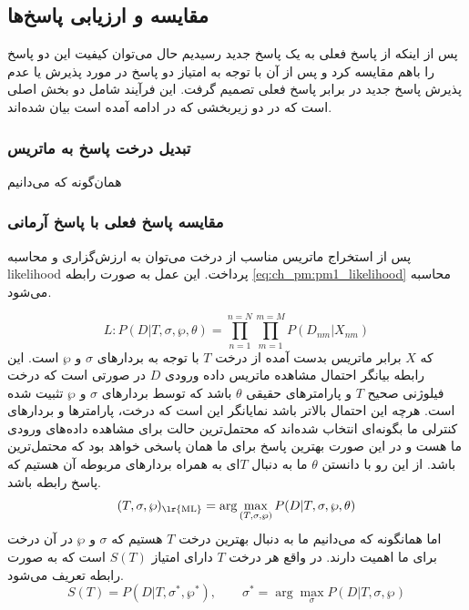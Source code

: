 \subsection{مقایسه و ارزیابی پاسخ‌ها}
پس از اینکه از پاسخ فعلی به یک پاسخ جدید رسیدیم حال می‌توان کیفیت این دو پاسخ را باهم مقایسه کرد و پس از آن با توجه به امتیاز دو پاسخ در مورد پذیرش یا عدم پذیرش پاسخ جدید در برابر پاسخ فعلی تصمیم گرفت. این فرآیند شامل دو بخش اصلی است که در دو زیربخشی که در ادامه آمده است بیان شده‌اند.

\subsubsection{تبدیل درخت پاسخ به ماتریس}
همان‌گونه که می‌دانیم 

\subsubsection{مقایسه پاسخ فعلی با پاسخ آرمانی}
پس از استخراج ماتریس مناسب از درخت می‌توان به ارزش‌گزاری و محاسبه \gls{likelihood} پرداخت. این عمل به صورت رابطه \ref{eq:ch_pm:pm1_likelihood} محاسبه می‌شود. 

\begin{equation}
	L: P(D|T,\sigma, \wp, \theta) = \prod_{n=1}^{n=N}\prod_{m=1}^{m=M}P(D_{nm}|X_{nm})
	\label{eq:ch_pm:pm1_likelihood}
\end{equation}
که $X$ برابر ماتریس بدست آمده از درخت $T$ با توجه به بردارهای $\sigma$ و $\wp$ است. این رابطه بیانگر احتمال مشاهده ماتریس داده ورودی $D$ در صورتی است که درخت فیلوژنی صحیح $T$ و پارامترهای حقیقی $\theta$ باشد که توسط بردارهای $\sigma$ و $\wp$ تثبیت شده است. هرچه این احتمال بالاتر باشد نمایانگر این است که درخت، پارامترها و بردارهای کنترلی ما بگونه‌ای انتخاب شده‌اند که محتمل‌ترین حالت برای مشاهده داده‌های ورودی ما هست و در این صورت بهترین پاسخ برای ما همان پاسخی خواهد بود که محتمل‌ترین باشد. از این رو با دانستن $\theta$ ما به دنبال $T$ای به همراه بردارهای مربوطه آن هستیم که پاسخ رابطه \label{eq:ch_pm:pm1_maxML} باشد.
\begin{equation}
	(T, \sigma, \wp)_{\text{\lr{ML}}} = \arg\max_{(T, \sigma, \wp)} P(D|T,\sigma, \wp, \theta)
	\label{eq:ch_pm:pm1_maxML}
\end{equation}
 اما همانگونه که می‌دانیم ما به دنبال بهترین درخت $T$ هستیم که $\sigma$ و $\wp$ در آن درخت برای ما اهمیت دارند. در واقع هر درخت $T$ دارای امتیاز $S(T)$ است که به صورت رابطه \label{eq:ch_pm:pm1_sT} تعریف می‌شود.
 \begin{equation}
 	S(T) = P(D|T,\sigma^*, \wp^*), \qquad \sigma^*=\arg\max_{\sigma}P(D|T,\sigma, \wp)
 	\label{eq:ch_pm:pm1_sT}
 \end{equation}

